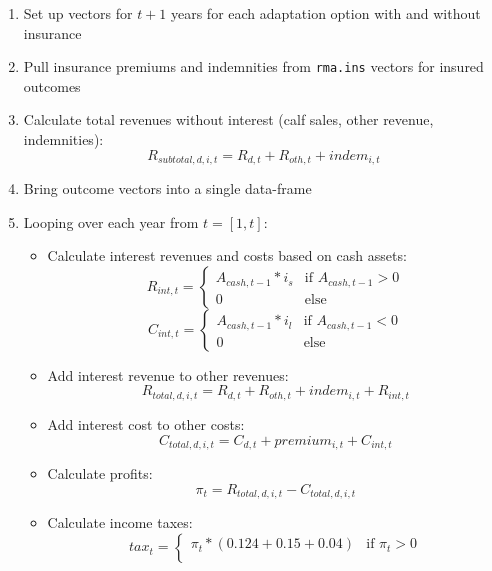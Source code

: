 \documentclass[11pt]{article}
\begin{document}
\begin{enumerate}
\item Set up vectors for $t+1$ years for each adaptation option with and without insurance
\item Pull insurance premiums and indemnities from \verb!rma.ins! vectors for insured outcomes
\item Calculate total revenues without interest (calf sales, other revenue, indemnities):
\begin{equation}
R_{subtotal,d,i,t} = R_{d,t} + R_{oth,t} +  indem_{i,t}
\end{equation}
\item Bring outcome vectors into a single data-frame
\item Looping over each year from $t=[1,t]$:
	\begin{itemize}
	\item Calculate interest revenues and costs based on cash assets:
	\begin{equation}
	R_{int,t} = 
	\begin{cases}
	A_{cash,t-1} * i_{s} & \text{if } A_{cash,t-1} > 0 \\
	0 & \text{else}
	\end{cases}
	\end{equation}
	\begin{equation}
	C_{int,t} = 
	\begin{cases}
	A_{cash,t-1} * i_{l} & \text{if } A_{cash,t-1} < 0 \\
	0 & \text{else}
	\end{cases}
	\end{equation}
	\item Add interest revenue to other revenues:
	\begin{equation}
	R_{total,d,i,t} = R_{d,t} + R_{oth,t} +  indem_{i,t} + R_{int,t}
	\end{equation}
	\item Add interest cost to other costs:
	\begin{equation}
	C_{total,d,i,t} = C_{d,t} + premium_{i,t} + C_{int,t}
	\end{equation}
	\item Calculate profits:
	\begin{equation}
	\pi_t = R_{total,d,i,t} - C_{total,d,i,t}
	\end{equation}
	\item Calculate income taxes:
	\begin{equation}
	tax_t = 
	\begin{cases}
	\pi_t * (0.124+0.15+0.04) & \text{if } \pi_t > 0 \\

\end{cases}
\end{equation}
\end{itemize}
\end{enumerate}
\end{document}

